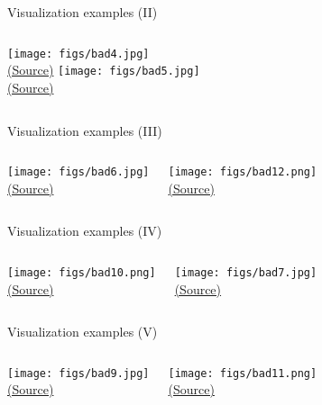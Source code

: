 \documentclass[10pt,compress]{beamer} %
\begin{document}
\begin{frame}{Visualization examples (II)}
	\begin{columns}
		\centering \texttt{[image: figs/bad4.jpg]}\\
		\centering \tiny \href{http://livingqlikview.com/the-9-worst-data-visualizations-ever-created/}{(Source)}
		\centering \texttt{[image: figs/bad5.jpg]}\\
		\centering \tiny \href{http://livingqlikview.com/the-9-worst-data-visualizations-ever-created/}{(Source)}
	\end{columns}
\end{frame}

\begin{frame}{Visualization examples (III)}
	\begin{columns}
	\centering \texttt{[image: figs/bad6.jpg]}\\
	\centering \tiny \href{http://livingqlikview.com/the-9-worst-data-visualizations-ever-created/}{(Source)}

	\centering \texttt{[image: figs/bad12.png]}\\
	\centering \tiny \href{http://viz.wtf/}{(Source)}
	\end{columns}
\end{frame}

\begin{frame}{Visualization examples (IV)}
	\begin{columns}
	\centering \texttt{[image: figs/bad10.png]}\\
	\centering \tiny \href{http://viz.wtf/}{(Source)}

	\centering \texttt{[image: figs/bad7.jpg]}\\
	\centering \tiny \href{http://livingqlikview.com/the-9-worst-data-visualizations-ever-created/}{(Source)}
	\end{columns}
\end{frame}

\begin{frame}{Visualization examples (V)}
	\begin{columns}
	\centering \texttt{[image: figs/bad9.jpg]}\\
	\centering \tiny \href{http://viz.wtf/}{(Source)}

	\bigskip

	\centering \texttt{[image: figs/bad11.png]}\\
	\tiny \href{http://viz.wtf/}{(Source)}
	\end{columns}
\end{frame}
\end{document}
